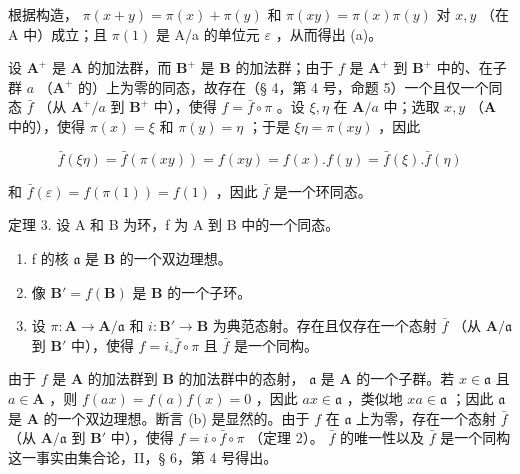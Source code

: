 根据构造， \(\pi(x + y) = \pi(x) + \pi(y)\) 和 \(\pi(xy) = \pi(x)\pi(y)\) 对 \(x, y\) （在 A 中）成立；且 \(\pi(1)\) 是 A/a 的单位元 \(\varepsilon\) ，从而得出 (a)。

设 \(\mathbf{A}^{+}\) 是 \(\mathbf{A}\) 的加法群，而 \(\mathbf{B}^{+}\) 是 \(\mathbf{B}\) 的加法群；由于 \(f\) 是 \(\mathbf{A}^{+}\) 到 \(\mathbf{B}^{+}\) 中的、在子群 \(a\) （\(\mathbf{A}^{+}\) 的）上为零的同态，故存在（§ 4，第 4 号，命题 5）一个且仅一个同态 \(\bar{f}\) （从 \(\mathbf{A}^{+}/a\) 到 \(\mathbf{B}^{+}\) 中），使得 \(f = \bar{f} \circ \pi\) 。设 \(\xi, \eta\) 在 \(\mathbf{A}/a\) 中；选取 \(x, y\) （\(\mathbf{A}\) 中的），使得 \(\pi(x) = \xi\) 和 \(\pi(y) = \eta\) ；于是 \(\xi \eta = \pi(xy)\) ，因此

\[
\bar {f} (\xi \eta) = \bar {f} (\pi (x y)) = f (x y) = f (x). f (y) = \bar {f} (\xi). \bar {f} (\eta)
\]

和 \(\bar{f}(\varepsilon) = f(\pi(1)) = f(1)\) ，因此 \(\bar{f}\) 是一个环同态。

定理 3. 设 A 和 B 为环，f 为 A 到 B 中的一个同态。

\begin{enumerate}
\def\labelenumi{(\alph{enumi})}
\item
  f 的核 \(\mathfrak{a}\) 是 \(\mathbf{B}\) 的一个双边理想。
\item
  像 \(\mathbf{B}' = f(\mathbf{B})\) 是 \(\mathbf{B}\) 的一个子环。
\item
  设 \(\pi: \mathbf{A} \to \mathbf{A} / \mathfrak{a}\) 和 \(i: \mathbf{B}' \to \mathbf{B}\) 为典范态射。存在且仅存在一个态射 \(\bar{f}\) （从 \(\mathbf{A} / \mathfrak{a}\) 到 \(\mathbf{B}'\) 中），使得 \(f = i_{\circ} \bar{f} \circ \pi\) 且 \(\bar{f}\) 是一个同构。
\end{enumerate}

由于 \(f\) 是 \(\mathbf{A}\) 的加法群到 \(\mathbf{B}\) 的加法群中的态射， \(\mathfrak{a}\) 是 \(\mathbf{A}\) 的一个子群。若 \(x \in \mathfrak{a}\) 且 \(a \in \mathbf{A}\) ，则 \(f(ax) = f(a)f(x) = 0\) ，因此 \(ax \in \mathfrak{a}\) ，类似地 \(xa \in \mathfrak{a}\) ；因此 \(\mathfrak{a}\) 是 \(\mathbf{A}\) 的一个双边理想。断言 (b) 是显然的。由于 \(f\) 在 \(\mathfrak{a}\) 上为零，存在一个态射 \(\bar{f}\) （从 \(\mathbf{A} / \mathfrak{a}\) 到 \(\mathbf{B}'\) 中），使得 \(f = i \circ \bar{f} \circ \pi\) （定理 2）。 \(\bar{f}\) 的唯一性以及 \(\bar{f}\) 是一个同构这一事实由集合论，II，§ 6，第 4 号得出。

